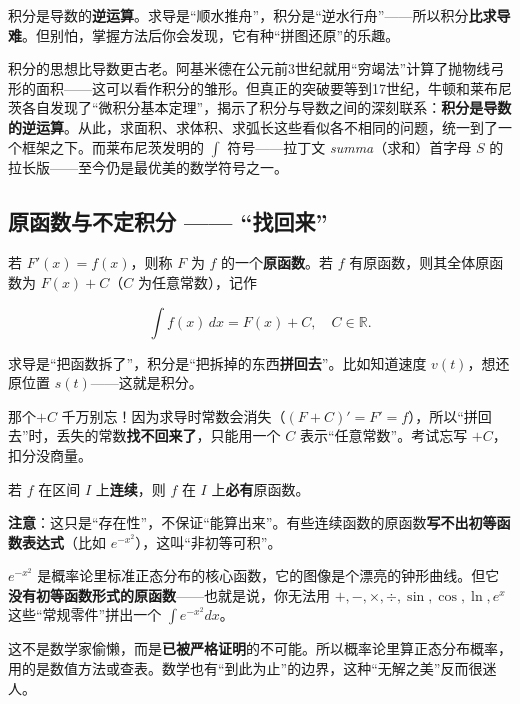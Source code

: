 \documentclass[11pt,a4paper]{article}
\newcommand{\keyw}[1]{\colorbox{cYellowL}{\textbf{\color{cOrange}#1}}}
\begin{document}
\begin{leadbox}[本章导读]
积分是导数的\keyw{逆运算}。求导是“顺水推舟”，积分是“逆水行舟”——所以积分\textbf{比求导难}。但别怕，掌握方法后你会发现，它有种“拼图还原”的乐趣。
\end{leadbox}

积分的思想比导数更古老。阿基米德在公元前3世纪就用“穷竭法”计算了抛物线弓形的面积——这可以看作积分的雏形。但真正的突破要等到17世纪，牛顿和莱布尼茨各自发现了“微积分基本定理”，揭示了积分与导数之间的深刻联系：\textbf{积分是导数的逆运算}。从此，求面积、求体积、求弧长这些看似各不相同的问题，统一到了一个框架之下。而莱布尼茨发明的 $\int$ 符号——拉丁文 \textit{summa}（求和）首字母 $S$ 的拉长版——至今仍是最优美的数学符号之一。

\subsection{原函数与不定积分 —— “找回来”}

\begin{defbox}[原函数与不定积分]
若 $F'(x)=f(x)$，则称 $F$ 为 $f$ 的一个\textbf{原函数}。若 $f$ 有原函数，则其全体原函数为 $F(x)+C$（$C$ 为任意常数），记作
\begin{eqbox}\[ \int f(x)\,dx = F(x)+C,\quad C\in\mathbb{R}. \]\end{eqbox}
\end{defbox}

\begin{plainbox}[白话解读：积分 = “找回原函数”]
求导是“把函数拆了”，积分是“把拆掉的东西\textbf{拼回去}”。比如知道速度 $v(t)$，想还原位置 $s(t)$——这就是积分。

那个\keyw{$+C$} 千万别忘！因为求导时常数会消失（$(F+C)'=F'=f$），所以“拼回去”时，丢失的常数\textbf{找不回来了}，只能用一个 $C$ 表示“任意常数”。考试忘写 $+C$，扣分没商量。
\end{plainbox}

\begin{tipbox}[原函数存在定理]
若 $f$ 在区间 $I$ 上\textbf{连续}，则 $f$ 在 $I$ 上\textbf{必有}原函数。

\textbf{注意}：这只是“存在性”，不保证“能算出来”。有些连续函数的原函数\keyw{写不出初等函数表达式}（比如 $e^{-x^2}$），这叫“非初等可积”。
\end{tipbox}

\begin{eggbox}
$e^{-x^2}$ 是概率论里标准正态分布的核心函数，它的图像是个漂亮的钟形曲线。但它\textbf{没有初等函数形式的原函数}——也就是说，你无法用 $+,-,\times,\div,\sin,\cos,\ln,e^x$ 这些“常规零件”拼出一个 $\int e^{-x^2}dx$。

这不是数学家偷懒，而是\keyw{已被严格证明}的不可能。所以概率论里算正态分布概率，用的是数值方法或查表。数学也有“到此为止”的边界，这种“无解之美”反而很迷人。
\end{eggbox}
\end{document}
